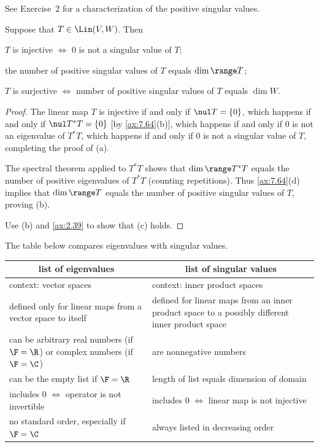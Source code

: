 See Exercise~2 for a characterization of the positive singular values.

\begin{result}\label{ax:7.68}
Suppose that $T\in\Lin(V,W)$. Then
\begin{parts}
\item $T$ is injective $\iff$ $0$ is not a singular value of $T$;
\item the number of positive singular values of $T$ equals $\dim\range T$;
\item $T$ is surjective $\iff$ number of positive singular values of $T$
  equals $\dim W$.
\end{parts}
\end{result}

\begin{proof}
The linear map $T$ is injective if and only if $\nul T=\{0\}$, which happens if
and only if $\nul T^*T=\{0\}$ [by \ref{ax:7.64}(b)], which happens if and only
if $0$ is not an eigenvalue of $T^*T$, which happens if and only if $0$ is not
a singular value of $T$, completing the proof of (a).

The spectral theorem applied to $T^*T$ shows that $\dim\range T^*T$ equals the
number of positive eigenvalues of $T^*T$ (counting repetitions). Thus
\ref{ax:7.64}(d) implies that $\dim\range T$ equals the number of positive
singular values of $T$, proving (b).

Use (b) and \ref{ax:2.39} to show that (c) holds.
\end{proof}

The table below compares eigenvalues with singular values.

\begin{center}\small
\begin{tabular}{|p{.44\linewidth}|p{.44\linewidth}|}
\hline
\multicolumn{1}{|c|}{\textbf{list of eigenvalues}} &
\multicolumn{1}{c|}{\textbf{list of singular values}}\\
\hline
context: vector spaces & context: inner product spaces\\
\hline
defined only for linear maps from a vector space to itself &
defined for linear maps from an inner product space to a possibly different
inner product space\\
\hline
can be arbitrary real numbers (if $\F=\R$) or complex numbers (if $\F=\C$) &
are nonnegative numbers\\
\hline
can be the empty list if $\F=\R$ & length of list equals dimension of domain\\
\hline
includes $0$ $\iff$ operator is not invertible &
includes $0$ $\iff$ linear map is not injective\\
\hline
no standard order, especially if $\F=\C$ & always listed in decreasing order\\
\hline
\end{tabular}
\end{center}

